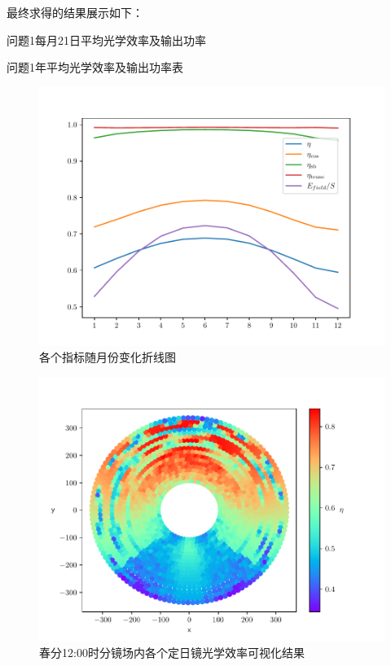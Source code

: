 \documentclass[../main.tex]{subfiles}
\begin{document}
最终求得的结果展示如下：
%
\begin{table}[H]
\centering

\caption{\kaishu 问题1每月21日平均光学效率及输出功率}
\end{table}
%
\begin{table}[H]
\centering

\caption{\kaishu 问题1年平均光学效率及输出功率表}
\end{table}
%
\begin{figure}[H]
\centering
\includegraphics[scale = 0.5]{zhexiantu.pdf}
\caption{\kaishu 各个指标随月份变化折线图}
\end{figure}
%
\begin{figure}[H]
\centering
\includegraphics[scale =0.7]{rainbow.pdf}
\caption{\kaishu 春分{\rm 12:00}时分镜场内各个定日镜光学效率可视化结果}\label{rainbow}
\end{figure}
\end{document}
